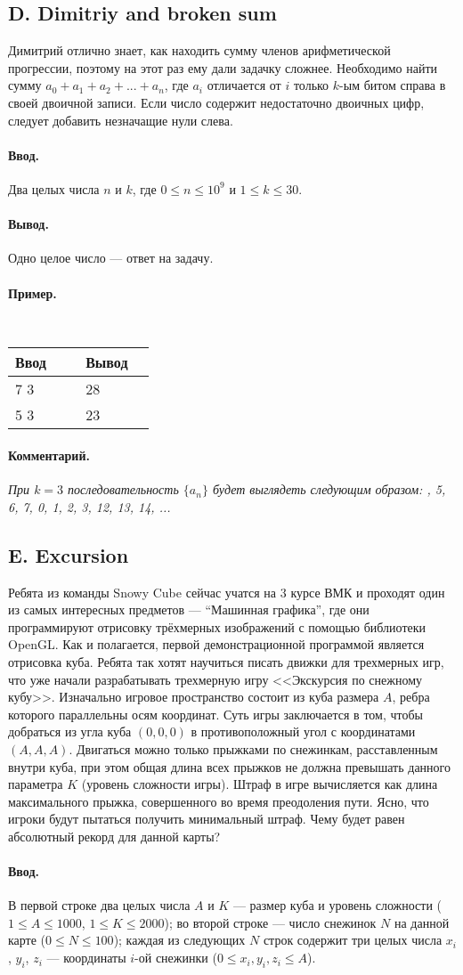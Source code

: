 \documentclass[12pt, a4paper]{article}
\newcommand{\informat}[1]
{
	\paragraph{Ввод.\\} #1
}
\newcommand{\outformat}[1]
{
	\paragraph{Вывод.\\} #1
}
\newcommand{\examplee}[4]
{
	\paragraph{Пример.\\}
	{\tt
	\begin{tabular}{|p{0.4\linewidth}|p{0.4\linewidth}|}
	\hline
	Ввод 	& Вывод  	\\
	\hline
	#1 		& #2 		\\
	\hline
	#3		& #4		\\
	\hline
	\end{tabular}
	}
}
\newcommand{\excomm}[1]
{
	\paragraph{Комментарий. \\}
	\textit{#1}
}
\begin{document}
\subsection*{D. Dimitriy and broken sum}

Димитрий отлично знает, как находить сумму членов арифметической прогрессии, поэтому на этот раз ему дали задачку сложнее.
Необходимо найти сумму $a_0 + a_1 + a_2 + ... + a_n$, где $a_i$ отличается от $i$ только $k$-ым битом справа в своей двоичной записи. Если число содержит недостаточно двоичных цифр, следует добавить незначащие нули слева.

\informat{Два целых числа $n$ и $k$, где $0 \le n \le 10^9$ и $1 \le k \le 30$.}

\outformat{Одно целое число --- ответ на задачу.}

\examplee{7 3}{28}{5 3}{23}

\excomm{При $k = 3$ последовательность $\{a_n\}$ будет выглядеть следующим образом: \newline
4, 5, 6, 7, 0, 1, 2, 3, 12, 13, 14, ...}



\subsection*{E. Excursion}

Ребята из команды Snowy Cube сейчас учатся на 3 курсе ВМК и проходят один из самых интересных предметов --- “Машинная графика”, где они программируют отрисовку трёхмерных изображений с помощью библиотеки OpenGL. Как и полагается, первой демонстрационной программой является отрисовка куба. Ребята так хотят научиться писать движки для трехмерных игр, что уже начали разрабатывать трехмерную игру <<Экскурсия по снежному кубу>>. Изначально игровое пространство состоит из куба размера $A$, ребра которого параллельны осям координат. Суть игры заключается в том, чтобы добраться из угла куба $(0, 0, 0)$ в противоположный угол с координатами $(A, A, A)$. Двигаться можно только прыжками по снежинкам, расставленным внутри куба, при этом общая длина всех прыжков не должна превышать данного параметра $K$ (уровень сложности игры). Штраф в игре вычисляется как длина максимального прыжка, совершенного во время преодоления пути. Ясно, что игроки будут пытаться получить минимальный штраф. Чему будет равен абсолютный рекорд для данной карты? 

\informat{В первой строке два целых числа $A$ и $K$ --- размер куба и уровень сложности ($1 \le A \le 1000$, $1 \le K \le 2000$); \newline
во второй строке --- число снежинок $N$ на данной карте ($0 \le N \le 100$); \newline
каждая из следующих $N$ строк содержит три целых числа $x_i$, $y_i$, $z_i$ --- координаты $i$-ой снежинки ($0 \le x_i, y_i, z_i \le A$).}
\end{document}
